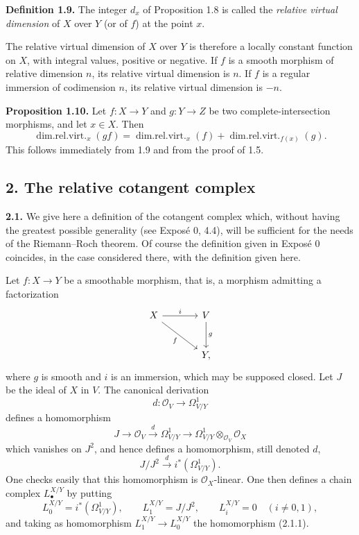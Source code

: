 \textbf{Definition 1.9.} The integer $d_x$ of Proposition 1.8 is called the \emph{relative virtual dimension} of $X$ over $Y$ (or of $f$) at the point $x$.

The relative virtual dimension of $X$ over $Y$ is therefore a locally constant function on $X$, with integral values, positive or negative. If $f$ is a smooth morphism of relative dimension $n$, its relative virtual dimension is $n$. If $f$ is a regular immersion of codimension $n$, its relative virtual dimension is $-n$.

\textbf{Proposition 1.10.} Let $f:X\to Y$ and $g:Y\to Z$ be two complete-intersection morphisms, and let $x\in X$. Then
\[
\operatorname{dim.rel.virt.}_x(gf)=
\operatorname{dim.rel.virt.}_x(f)+
\operatorname{dim.rel.virt.}_{f(x)}(g).
\]
This follows immediately from 1.9 and from the proof of 1.5.

\subsection*{2. The relative cotangent complex}

\textbf{2.1.} We give here a definition of the cotangent complex which, without having the greatest possible generality (see Expos\'e 0, 4.4), will be sufficient for the needs of the Riemann--Roch theorem. Of course the definition given in Expos\'e 0 coincides, in the case considered there, with the definition given here.

Let $f:X\to Y$ be a smoothable morphism, that is, a morphism admitting a factorization
\[
\begin{tikzcd}[column sep=large,row sep=large]
X \arrow[r,"i"] \arrow[dr,"f"'] & V \arrow[d,"g"]\\
& Y,
\end{tikzcd}
\]
where $g$ is smooth and $i$ is an immersion, which may be supposed closed. Let $J$ be the ideal of $X$ in $V$. The canonical derivation
\[
d:\mathcal O_V\longrightarrow\Omega^1_{V/Y}
\]
defines a homomorphism
\[
J\longrightarrow\mathcal O_V\xrightarrow{d}\Omega^1_{V/Y}\longrightarrow
\Omega^1_{V/Y}\otimes_{\mathcal O_V}\mathcal O_X
\]
which vanishes on $J^2$, and hence defines a homomorphism, still denoted $d$,
\begin{equation}\tag{2.1.1}
J/J^2\xrightarrow{d} i^*(\Omega^1_{V/Y}).
\end{equation}
One checks easily that this homomorphism is $\mathcal O_X$-linear. One then defines a chain complex $L^{X/Y}_\bullet$ by putting
\[
L^{X/Y}_0=i^*(\Omega^1_{V/Y}),\qquad
L^{X/Y}_1=J/J^2,
\qquad
L^{X/Y}_i=0\quad(i\neq 0,1),
\]
and taking as homomorphism $L^{X/Y}_1\to L^{X/Y}_0$ the homomorphism (2.1.1).

